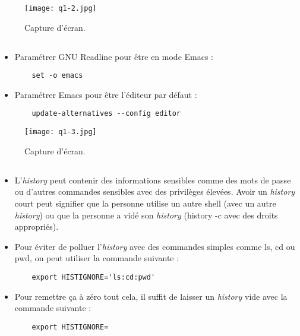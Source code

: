 \documentclass{article}
\begin{document}
\begin{figure}[h]
\centering
\texttt{[image: q1-2.jpg]}
\caption{\label{fig:frog}Capture d'écran.}
\end{figure}

\subsection{}

\begin{itemize}
    \item Paramétrer GNU Readline pour être en mode Emacs :
    \begin{lstlisting}
    set -o emacs
    \end{lstlisting}
    \item Paramétrer Emacs pour être l’éditeur par défaut :
    \begin{lstlisting}
    update-alternatives --config editor
    \end{lstlisting}
\end{itemize}

\begin{figure}[h]
\centering
\texttt{[image: q1-3.jpg]}
\caption{\label{fig:frog}Capture d'écran.}
\end{figure}

\subsection{}

\begin{itemize}
    \item L’\emph{history} peut contenir des informations sensibles comme des mots de passe ou d’autres commandes sensibles avec des privilèges élevées. Avoir un \emph{history} court peut signifier que la personne utilise un autre shell (avec un autre \emph{history}) ou que la personne a vidé son \emph{history} (history -c avec des droits appropriés).
    \item Pour éviter de polluer l’\emph{history} avec des commandes simples comme ls, cd ou pwd, on peut utiliser la commande suivante :
    \begin{lstlisting}
    export HISTIGNORE='ls:cd:pwd'
    \end{lstlisting}
    \item Pour remettre ça à zéro tout cela, il suffit de laisser un \emph{history} vide avec la commande suivante :
    \begin{lstlisting}
    export HISTIGNORE=
    \end{lstlisting}
\end{itemize}
\end{document}
